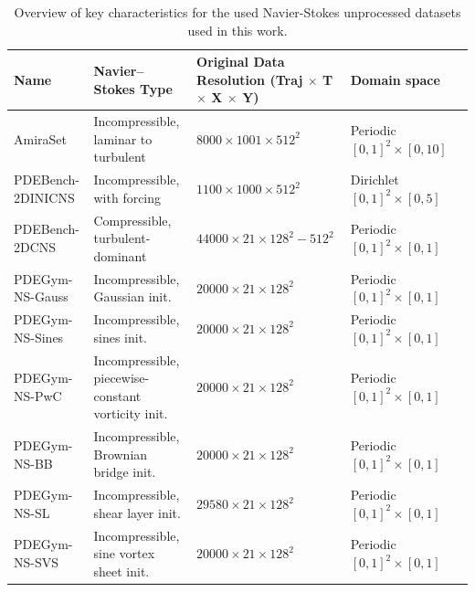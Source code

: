 
\begin{table}[H]
\centering
\caption{Overview of key characteristics for the used Navier-Stokes unprocessed datasets used in this work. }
\label{tab:datasetproperties}
\small
\setlength{\tabcolsep}{6pt}
\begin{tabular}{p{2.6cm} p{3.6cm} p{3.2cm} p{2.4cm} p{6.2cm}}
\toprule
\textbf{Name} &
\textbf{Navier--Stokes Type} &
\textbf{Original Data Resolution       (Traj $\times$ T $\times$ X $\times$ Y)} &
\textbf{Domain space} \\
\midrule
AmiraSet &
Incompressible, laminar to turbulent &
$8000 \times 1001 \times 512^2$ &
Periodic $[0,1]^2 \times [0,10]$ \\

\midrule
PDEBench-2DINICNS &
Incompressible, with forcing &
$1100 \times 1000 \times 512^2$ &
Dirichlet $[0,1]^2 \times [0,5]$ \\

PDEBench-2DCNS &
Compressible, turbulent-dominant &
$44000 \times 21 \times 128^2-512^2$ &
Periodic $[0,1]^2 \times [0,1]$ \\

\midrule
PDEGym-NS-Gauss &
Incompressible, Gaussian init. &
$20000 \times 21 \times 128^2$ &
Periodic $[0,1]^2 \times [0,1]$ \\

PDEGym-NS-Sines &
Incompressible, sines init. &
$20000 \times 21 \times 128^2$ &
Periodic $[0,1]^2 \times [0,1]$ \\

PDEGym-NS-PwC &
Incompressible, piecewise-constant vorticity init. &
$20000 \times 21 \times 128^2$ &
Periodic $[0,1]^2 \times [0,1]$ \\

PDEGym-NS-BB &
Incompressible, Brownian bridge init. &
$20000 \times 21 \times 128^2$ & 
Periodic $[0,1]^2 \times [0,1]$ \\

PDEGym-NS-SL &
Incompressible, shear layer init. &
$29580 \times 21 \times 128^2$ &
Periodic $[0,1]^2 \times [0,1]$ \\

PDEGym-NS-SVS &
Incompressible, sine vortex sheet init. &
$20000 \times 21 \times 128^2$ &
Periodic $[0,1]^2 \times [0,1]$ \\
\bottomrule
\end{tabular}

\label{table:properties}
\end{table}
